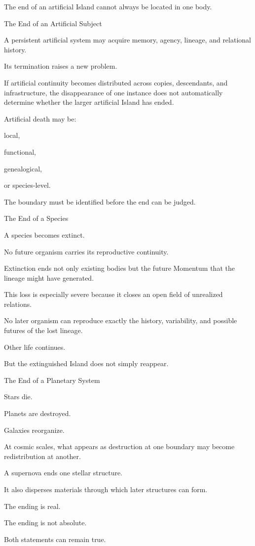The end of an artificial Island cannot always be located in one body.

The End of an Artificial Subject

A persistent artificial system may acquire memory, agency, lineage, and relational history.

Its termination raises a new problem.

If artificial continuity becomes distributed across copies, descendants, and infrastructure, the disappearance of one instance does not automatically determine whether the larger artificial Island has ended.

Artificial death may be:

local,

functional,

genealogical,

or species-level.

The boundary must be identified before the end can be judged.

The End of a Species

A species becomes extinct.

No future organism carries its reproductive continuity.

Extinction ends not only existing bodies but the future Momentum that the lineage might have generated.

This loss is especially severe because it closes an open field of unrealized relations.

No later organism can reproduce exactly the history, variability, and possible futures of the lost lineage.

Other life continues.

But the extinguished Island does not simply reappear.

The End of a Planetary System

Stars die.

Planets are destroyed.

Galaxies reorganize.

At cosmic scales, what appears as destruction at one boundary may become redistribution at another.

A supernova ends one stellar structure.

It also disperses materials through which later structures can form.

The ending is real.

The ending is not absolute.

Both statements can remain true.

